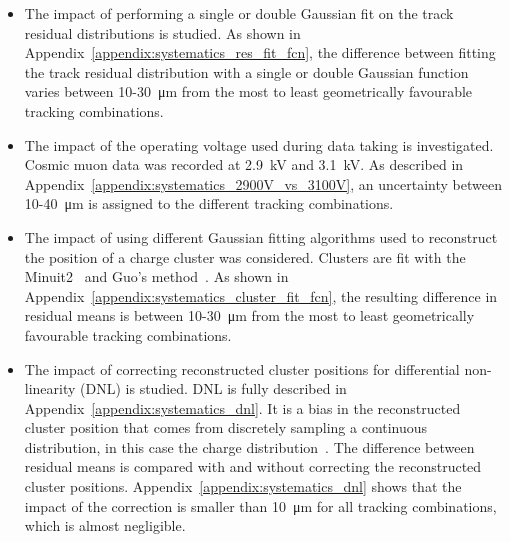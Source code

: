 \begin{itemize}
  \item The impact of performing a single or double Gaussian fit on the track residual distributions is studied. As shown in Appendix~\ref{appendix:systematics_res_fit_fcn}, the difference between fitting the track residual distribution with a single or double Gaussian function varies between 10-\SI{30}{\micro\meter} from the most to least geometrically favourable tracking combinations.
  \item The impact of the operating voltage used during data taking is investigated. Cosmic muon data was recorded at \SI{2.9}{kV} and \SI{3.1}{kV}. As described in Appendix~\ref{appendix:systematics_2900V_vs_3100V}, an uncertainty between 10-\SI{40}{\micro\meter} is assigned to the different tracking combinations.
  \item The impact of using different Gaussian fitting algorithms used to reconstruct the position of a charge cluster was considered. Clusters are fit with the Minuit2~\cite{hatlo_developments_2005} and Guo's method~\cite{guo_simple_2011}. As shown in Appendix~\ref{appendix:systematics_cluster_fit_fcn}, the resulting difference in residual means is between 10-\SI{30}{\micro\meter} from the most to least geometrically favourable tracking combinations.
  \item The impact of correcting reconstructed cluster positions for differential non-linearity (DNL) is studied. DNL is fully described in Appendix~\ref{appendix:systematics_dnl}. It is a bias in the reconstructed cluster position that comes from discretely sampling a continuous distribution, in this case the charge distribution~\cite{endo_systematic_1981, lefebvre_thesis, abusleme_performance_2016}. The difference between residual means is compared with and without correcting the reconstructed cluster positions. Appendix~\ref{appendix:systematics_dnl} shows that the impact of the correction is smaller than \SI{10}{\micro\meter} for all tracking combinations, which is almost negligible.
\end{itemize}

